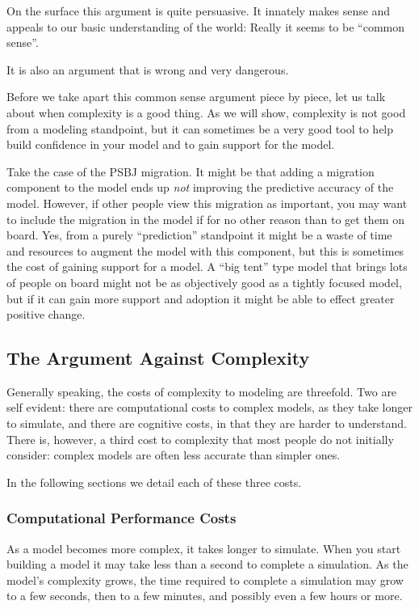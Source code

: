 \documentclass[]{memoir}
\begin{document}
On the surface this argument is quite persuasive. It innately makes
sense and appeals to our basic understanding of the world: Really it
seems to be ``common sense''.

It is also an argument that is wrong and very dangerous.

Before we take apart this common sense argument piece by piece, let us
talk about when complexity is a good thing. As we will show, complexity
is not good from a modeling standpoint, but it can sometimes be a very
good tool to help build confidence in your model and to gain support for
the model.

Take the case of the PSBJ migration. It might be that adding a migration
component to the model ends up \emph{not} improving the predictive
accuracy of the model. However, if other people view this migration as
important, you may want to include the migration in the model if for no
other reason than to get them on board. Yes, from a purely
``prediction'' standpoint it might be a waste of time and resources to
augment the model with this component, but this is sometimes the cost of
gaining support for a model. A ``big tent'' type model that brings lots
of people on board might not be as objectively good as a tightly focused
model, but if it can gain more support and adoption it might be able to
effect greater positive change.

\subsection{The Argument Against Complexity}

Generally speaking, the costs of complexity to modeling are threefold.
Two are self evident: there are computational costs to complex models,
as they take longer to simulate, and there are cognitive costs, in that
they are harder to understand. There is, however, a third cost to
complexity that most people do not initially consider: complex models
are often less accurate than simpler ones.

In the following sections we detail each of these three costs.

\subsubsection{Computational Performance Costs}

As a model becomes more complex, it takes longer to simulate. When you
start building a model it may take less than a second to complete a
simulation. As the model's complexity grows, the time required to
complete a simulation may grow to a few seconds, then to a few minutes,
and possibly even a few hours or more.
\end{document}
